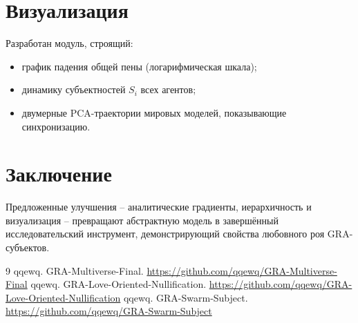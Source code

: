 \documentclass[12pt]{article}
\begin{document}
\section{Визуализация}
Разработан модуль, строящий:
\begin{itemize}
    \item график падения общей пены (логарифмическая шкала);
    \item динамику субъектностей $S_i$ всех агентов;
    \item двумерные PCA-траектории мировых моделей, показывающие синхронизацию.
\end{itemize}

\section{Заключение}
Предложенные улучшения – аналитические градиенты, иерархичность и визуализация – превращают абстрактную модель в завершённый исследовательский инструмент, демонстрирующий свойства любовного роя GRA-субъектов.

\begin{thebibliography}{9}
 qqewq. GRA-Multiverse-Final. \url{https://github.com/qqewq/GRA-Multiverse-Final}
 qqewq. GRA-Love-Oriented-Nullification. \url{https://github.com/qqewq/GRA-Love-Oriented-Nullification}
 qqewq. GRA-Swarm-Subject. \url{https://github.com/qqewq/GRA-Swarm-Subject}
\end{thebibliography}
\end{document}

